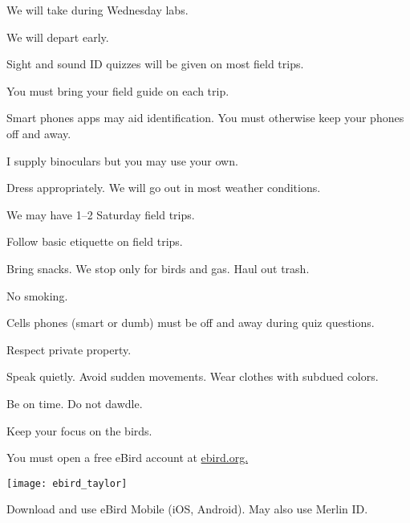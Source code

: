 \documentclass[t]{beamer}
\begin{document}
\begin{frame}[t,plain]{We will take  during Wednesday labs.}

	\hangpara We will depart early. 
	
	\hangpara Sight and sound ID quizzes will be given on most field trips.
	
	\hangpara You must bring your field guide on each trip.

	\hangpara Smart phones apps may aid identification. You must otherwise keep your phones off and away.

	\hangpara I supply binoculars but you may use your own. 

	\hangpara Dress appropriately.  We will go out in most weather conditions.
		
	\hangpara We may have 1–2 Saturday field trips.
	
\end{frame}

\begin{frame}[t,plain]{Follow basic etiquette on field trips.}

	\hangpara Bring snacks. We stop only for birds and gas. Haul out  trash.
	
	\hangpara No smoking.
	

	\hangpara Cells phones (smart or dumb) must be off and away during quiz questions.

	\hangpara Respect private property.
	
	\hangpara Speak quietly. Avoid sudden movements. Wear clothes with subdued colors.
	
	\hangpara Be on time. Do not dawdle.
	
	\hangpara Keep your focus on the birds.
	
\end{frame}

{
\begin{frame}{You must open a free eBird account at \href{https://ebird.org}{ebird.org.}}
	\vspace{-\baselineskip}
	\begin{center}
		\texttt{[image: ebird\_taylor]}
	\end{center}
	
	Download and use eBird Mobile (iOS, Android). May also use Merlin ID.
%	
\end{frame}
}
\end{document}
